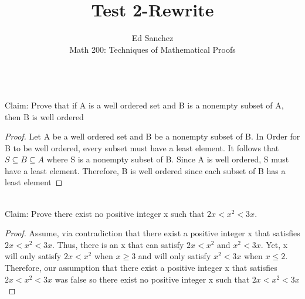 \documentclass[12pt]{article}
\newenvironment{problem}[2][Problem]{\begin{trivlist}
\item[\hskip \labelsep {\bfseries #1}\hskip \labelsep {\bfseries #2.}]}{\end{trivlist}}
\begin{document}
 
\title{Test 2-Rewrite}
\author{Ed Sanchez\\ 
Math 200: Techniques of Mathematical Proofs}
 
\maketitle
 
\begin{problem}{1}
\text{ }\\
Claim: Prove that if A is a well ordered set and B is a nonempty subset of A, then B is well ordered
\end{problem}
 
\begin{proof}
Let A be a well ordered set and B be a nonempty subset of B. In Order for B to be well ordered, every subset must have a least element. It follows that $S\subseteq B \subseteq A$ where S is a nonempty subset of B. Since A is well ordered, S must have a least element. Therefore, B is well ordered since each subset of B has a least element
\end{proof}
 
\begin{problem}{2}
\text{ }\\
 Claim: Prove there exist no positive integer x such that $2x < x^2 < 3x$.
\end{problem}
\begin{proof}
Assume, via contradiction that there exist a positive integer x that satisfies $2x < x^2 < 3x$. Thus, there is an x that can satisfy $2x < x^2$ and $x^2 < 3x$. Yet, x will only satisfy $2x<x^2$ when $x \geq 3$ and will only satisfy $x^2 < 3x$ when $x \leq 2$. Therefore, our assumption that there exist a positive integer x that satisfies $2x < x^2 < 3x$ was false so there exist no positive integer x such that $2x < x^2 < 3x$
\end{proof} 
\end{document}
